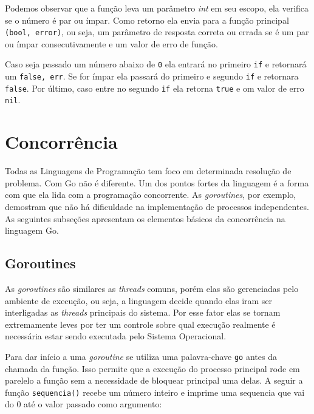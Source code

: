 \documentclass{SBCbookchapter}
\begin{document}
Podemos observar que a função leva um parâmetro \textit{int} em seu escopo, ela verifica se o número é par ou ímpar. Como retorno ela envia para a função principal \texttt{(bool, error)}, ou seja, um parâmetro de resposta correta ou errada se é um par ou ímpar consecutivamente e um valor de erro de função. 


Caso seja passado um número abaixo de \texttt{0} ela entrará no primeiro \texttt{if} e retornará um \texttt{false, err}. Se for ímpar ela passará do primeiro e segundo \texttt{if} e retornara \texttt{false}. Por último, caso entre no segundo \texttt{if} ela retorna \texttt{true} e om valor de erro \texttt{nil}.


\section{Concorrência}

\label{concorrencia}

Todas as Linguagens de Programação tem foco em determinada resolução de problema. Com Go não é diferente. Um dos pontos fortes da linguagem é a forma com que ela lida com a programação concorrente. As \textit{goroutines}, por exemplo, demostram que não há dificuldade na implementação de processos independentes. As seguintes subseções apresentam os elementos básicos da concorrência na linguagem Go.

\subsection{Goroutines}

As \textit{goroutines} são similares as \textit{threads} comuns, porém elas são gerenciadas pelo ambiente de execução, ou seja, a linguagem decide quando elas iram ser interligadas as \textit{threads} principais do sistema. Por esse fator elas se tornam extremamente leves por ter um controle sobre qual execução realmente é necessária estar sendo executada pelo Sistema Operacional.

Para dar início a uma \textit{goroutine} se utiliza uma palavra-chave \texttt{go} antes da chamada da função. Isso permite que a execução do processo principal rode em parelelo a função sem a necessidade de bloquear principal uma delas. A seguir a função \texttt{sequencia()} recebe um número inteiro e imprime uma sequencia que vai do 0 até o valor passado como argumento:
\end{document}
